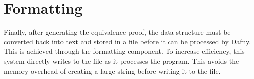 \section{Formatting}

Finally, after generating the equivalence proof, the data structure must be converted back into text and stored in a file before it can be processed by Dafny. This is achieved through the formatting component. To increase efficiency, this system directly writes to the file as it processes the program. This avoids the memory overhead of creating a large string before writing it to the file. 
